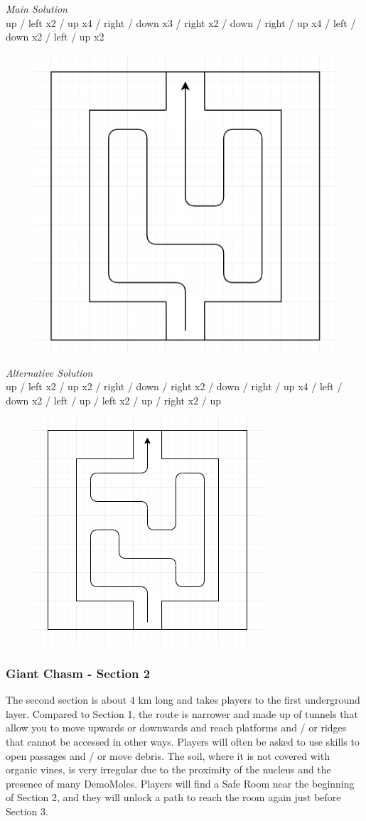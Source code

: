 \newpage

\textit{Main Solution}\\
up / left x2 / up x4 / right / down x3 / right x2 / down / right / up x4 / left / down x2 / left / up x2\\

\begin{figure}[H]
	\centering
	\includegraphics[width=0.5\linewidth]{images/puzzle/puzzle_011.png}
\end{figure}

\textit{Alternative Solution}\\
up / left x2 / up x2 / right / down / right x2 / down / right / up x4 / left / down x2 / left / up / left x2 / up / right x2 / up\\

\begin{figure}[H]
	\centering
	\includegraphics[width=0.5\linewidth]{images/puzzle/puzzle_012.png}
\end{figure}
\newpage


\subsubsection{Giant Chasm - Section 2}
The second section is about 4 km long and takes players to the first underground layer.
Compared to Section 1, the route is narrower and made up of tunnels that allow you to move upwards or downwards and reach platforms and / or ridges that cannot be accessed in other ways. Players will often be asked to use skills to open passages and / or move debris. The soil, where it is not covered with organic vines, is very irregular due to the proximity of the nucleus and the presence of many DemoMoles. Players will find a Safe Room near the beginning of Section 2, and they will unlock a path to reach the room again just before Section 3.

